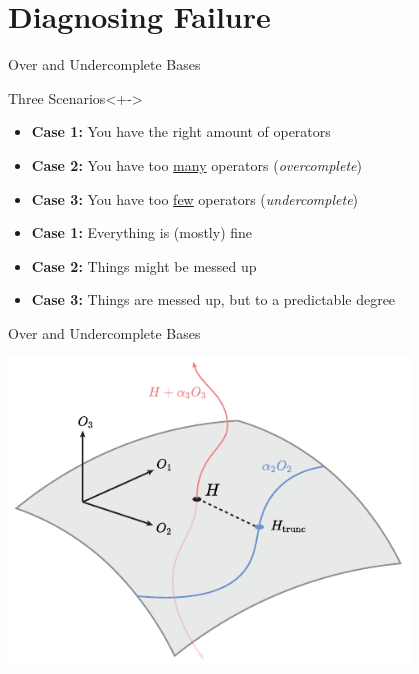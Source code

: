 \documentclass{beamer}
\begin{document}
\section{Diagnosing Failure}
\begin{frame}{Over and Undercomplete Bases}
\begin{exampleblock}{Three Scenarios}<+->
	\begin{itemize}
	\item<+-> \textbf{Case 1:} You have the right amount of operators 
	\item<+-> \textbf{Case 2:} You have too \underline{many} operators (\textit{overcomplete})
	\item<+-> \textbf{Case 3:} You have too \underline{few} operators (\textit{undercomplete})
	\end{itemize} 
\end{exampleblock}
\begin{itemize}
\item<+-> \textbf{Case 1:} Everything is (mostly) fine
\item<+-> \textbf{Case 2:} Things might be messed up 
\item<+-> \textbf{Case 3:} Things are messed up, but to a predictable
	degree
\end{itemize}
\end{frame}

\begin{frame}{Over and Undercomplete Bases}
\begin{center}
\includegraphics[width=0.8\textwidth]{figs/hrecon_main.pdf}
\end{center}
\end{frame}
\end{document}
